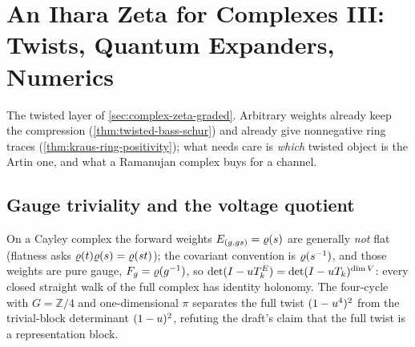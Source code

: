 
\section{An Ihara Zeta for Complexes III: Twists, Quantum Expanders, Numerics}
\label{sec:complex-zeta-quantum}

The twisted layer of \cref{sec:complex-zeta-graded}. Arbitrary weights already
keep the compression (\cref{thm:twisted-bass-schur}) and already give
nonnegative ring traces (\cref{thm:kraus-ring-positivity}); what needs care is
\emph{which} twisted object is the Artin one, and what a Ramanujan complex buys
for a channel.

\subsection{Gauge triviality and the voltage quotient}
\begin{proposition}
\label{prop:pure-gauge-full-complex}
On a Cayley complex the forward weights $E_{(g,gs)} = \varrho(s)$ are generally
\emph{not} flat (flatness asks $\varrho(t)\varrho(s) = \varrho(st)$); the covariant
convention is $\varrho(s^{-1})$, and those weights are pure gauge, $F_g =
\varrho(g^{-1})$, so $\det(I-u T^E_k) = \det(I-u T_k)^{\dim V}$: every closed
straight walk of the full complex has identity holonomy. The four-cycle with
$G = \mathbb Z/4$ and one-dimensional $\pi$ separates the full twist
$(1-u^4)^2$ from the trivial-block determinant $(1-u)^2$, refuting the
draft's claim that the full twist is a representation block.
\end{proposition}

